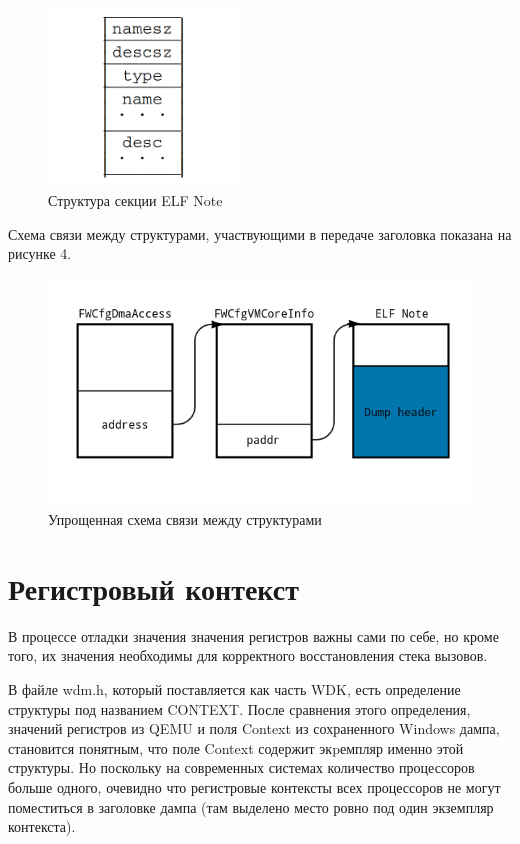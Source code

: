 \documentclass{mipt-thesis-bs}
\begin{document}
\begin{figure}[h]
\begin{center}
    \includegraphics[width=5cm]{note.png}
    \caption{Структура секции ELF Note}
\end{center}
\end{figure}

Схема связи между структурами, участвующими в передаче заголовка показана на рисунке 4.

\begin{figure}[h]
\begin{center}
    \includegraphics[width=1\textwidth]{vmci_scheme1.png}
    \caption{Упрощенная схема связи между структурами}
\end{center}
\end{figure}

\section*{Регистровый контекст}

В процессе отладки значения значения регистров важны сами по себе, но кроме того, их значения необходимы для корректного восстановления стека вызовов.

В файле wdm.h, который поставляется как часть WDK, есть определение структуры под названием CONTEXT. После сравнения этого определения, значений регистров из QEMU и поля Context из сохраненного Windows дампа, становится понятным, что поле Context содержит экpемпляр именно этой структуры. Но поскольку на современных системах количество процессоров больше одного, очевидно что регистровые контексты всех процессоров не могут поместиться в заголовке дампа (там выделено место ровно под один экземпляр контекста).
\end{document}

